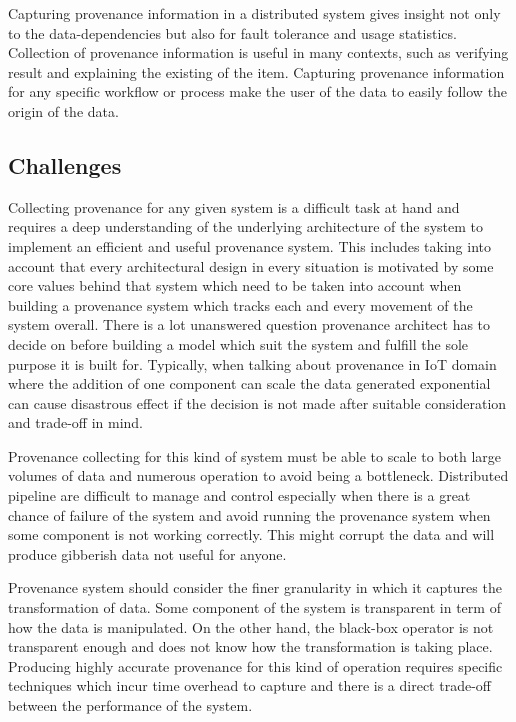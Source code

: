 Capturing provenance information in a distributed system gives insight not only to the data-dependencies but also for fault tolerance and usage statistics. Collection of provenance information is useful in many contexts, such as verifying result and explaining the existing of the item. Capturing provenance information for any specific workflow or process make the user of the data to easily follow the origin of the data. 


\subsection{Challenges}
Collecting provenance for any given system is a difficult task at hand and requires a deep understanding of the underlying architecture of the system to implement an efficient and useful provenance system. This includes taking into account that every architectural design in every situation is motivated by some core values behind that system which need to be taken into account when building a provenance system which tracks each and every movement of the system overall. There is a lot unanswered question provenance architect has to decide on before building a model which suit the system and fulfill the sole purpose it is built for. Typically, when talking about provenance in IoT domain where the addition of one component can scale the data generated exponential can cause disastrous effect if the decision is not made after suitable consideration and trade-off in mind. 

Provenance collecting for this kind of system must be able to scale to both large volumes of data and numerous operation to avoid being a bottleneck. Distributed pipeline are difficult to manage and control especially when there is a great chance of failure of the system and avoid running the provenance system when some component is not working correctly. This might corrupt the data and will produce gibberish data not useful for anyone.

Provenance system should consider the finer granularity in which it captures the transformation of data. Some component of the system is transparent in term of how the data is manipulated.  On the other hand, the black-box operator is not transparent enough and does not know how the transformation is taking place. Producing highly accurate provenance for this kind of operation requires specific techniques which incur time overhead to capture and there is a direct trade-off between the performance of the system.



